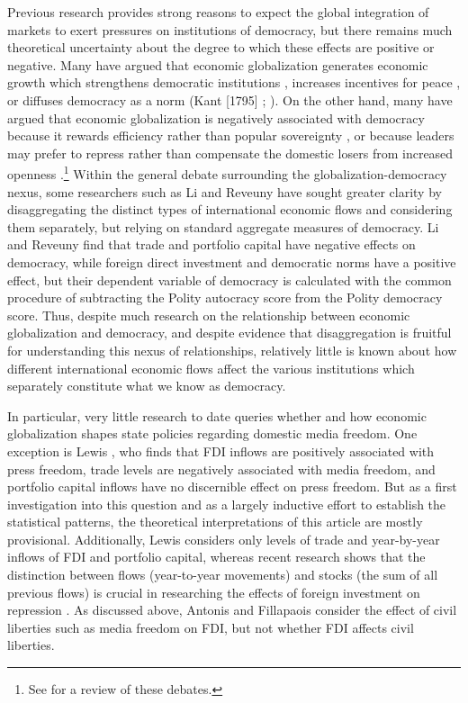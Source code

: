 \documentclass[a4paper]{article}\usepackage[]{graphicx}\usepackage[]{color}
\begin{document}
Previous research provides strong reasons to expect the global integration of markets to exert pressures on institutions of democracy, but there remains much theoretical uncertainty about the degree to which these effects are positive or negative. Many have argued that economic globalization generates economic growth which strengthens democratic institutions \parencites{Baghwati:1997vy}{Im:1996cl}, increases incentives for peace \parencites{Baghwati:1997vy}{Oneal:1999fc}, or diffuses democracy as a norm (Kant [1795] \cite*{Kant:1983uf}; \cite{Limongi:1996dr}). On the other hand, many have argued that economic globalization is negatively associated with democracy because it rewards efficiency rather than popular sovereignty \parencites{Huntington:1975vt}{Lindblom:1977ue}{Cammack:1998gf}, or because leaders may prefer to repress rather than compensate the domestic losers from increased openness \parencite{Adsera:2002vt}.\footnote{See \cite{Milner:2009hi} for a review of these debates.} Within the general debate surrounding the globalization-democracy nexus, some researchers such as Li and Reveuny \parencite*{Li:2003vj} have sought greater clarity by disaggregating the distinct types of international economic flows and considering them separately, but relying on standard aggregate measures of democracy. Li and Reveuny find that trade and portfolio capital have negative effects on democracy, while foreign direct investment and democratic norms have a positive effect, but their dependent variable of democracy is calculated with the common procedure of subtracting the Polity autocracy score from the Polity democracy score. Thus, despite much research on the relationship between economic globalization and democracy, and despite evidence that disaggregation is fruitful for understanding this nexus of relationships, relatively little is known about how different international economic flows affect the various institutions which separately constitute what we know as democracy.

In particular, very little research to date queries whether and how economic globalization shapes state policies regarding domestic media freedom. One exception is Lewis \parencite*{Lewis:qDvYbWlU}, who finds that FDI inflows are positively associated with press freedom, trade levels are negatively associated with media freedom, and portfolio capital inflows have no discernible effect on press freedom. But as a first investigation into this question and as a largely inductive effort to establish the statistical patterns, the theoretical interpretations of this article are mostly provisional. Additionally, Lewis considers only levels of trade and year-by-year inflows of FDI and portfolio capital, whereas recent research shows that the distinction between flows (year-to-year movements) and stocks (the sum of all previous flows) is crucial in researching the effects of foreign investment on repression \parencite{Sorens:2012hc}. As discussed above, Antonis and Fillapaois \parencite*{Adam:2007gn} consider the effect of civil liberties such as media freedom on FDI, but not whether FDI affects civil liberties.
\end{document}
